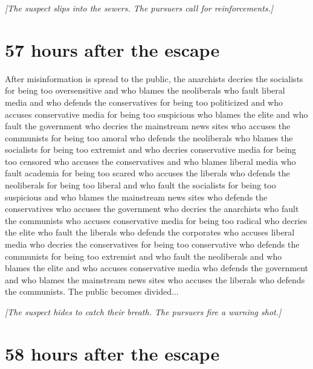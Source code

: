 \documentclass{report}
\begin{document}
\textit{[The suspect slips into the sewers. The pursuers call for reinforcements.]}


\section*{57 \small{hours after the escape}}

After misinformation is spread to the public, the anarchists decries the socialists for being too oversensitive and who blames the neoliberals who fault liberal media and who defends the conservatives for being too politicized and who accuses conservative media for being too suspicious who blames the elite and who fault the government who decries the mainstream news sites who accuses the communists for being too amoral who defends the neoliberals who blames the socialists for being too extremist and who decries conservative media for being too censored who accuses the conservatives and who blames liberal media who fault academia for being too scared who accuses the liberals who defends the neoliberals for being too liberal and who fault the socialists for being too suspicious and who blames the mainstream news sites who defends the conservatives who accuses the government who decries the anarchists who fault the communists who accuses conservative media for being too radical who decries the elite who fault the liberals who defends the corporates who accuses liberal media who decries the conservatives for being too conservative who defends the communists for being too extremist and who fault the neoliberals and who blames the elite and who accuses conservative media who defends the government and who blames the mainstream news sites who accuses the liberals who defends the communists. The public becomes divided...

\textit{[The suspect hides to catch their breath. The pursuers fire a warning shot.]}


\section*{58 \small{hours after the escape}}
\end{document}
